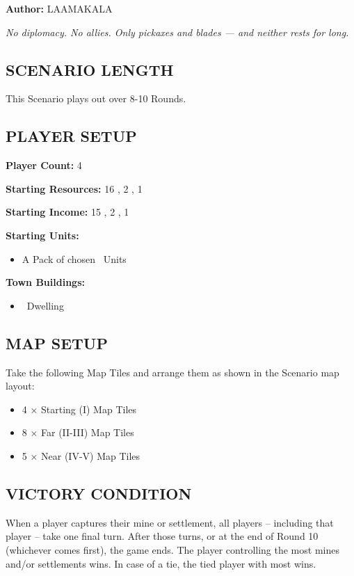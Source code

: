 
\begin{multicols*}{2}

\textbf{Author:} LAAMAKALA

\textit{No diplomacy. No allies. Only pickaxes and blades — and neither rests for long.}

\subsection*{\MakeUppercase{Scenario Length}}
This Scenario plays out over 8-10 Rounds.

\subsection*{\MakeUppercase{Player Setup}}
\textbf{Player Count:} 4

\textbf{Starting Resources:} 16 , 2 , 1 

\textbf{Starting Income:} 15 , 2 , 1 

\textbf{Starting Units:}
\begin{itemize}
  \item A Pack of chosen \bronze\ Units
\end{itemize}

\textbf{Town Buildings:}
\begin{itemize}
  \item \bronze\ Dwelling
\end{itemize}

\subsection*{\MakeUppercase{Map Setup}}
Take the following Map Tiles and arrange them as shown in the Scenario map layout:

\begin{itemize}
  \item 4 × Starting (I) Map Tiles
  \item 8 × Far (II-III) Map Tiles
  \item 5 × Near (IV-V) Map Tiles
\end{itemize}

\subsection*{\MakeUppercase{Victory Condition}}
When a player captures their  mine or settlement, all players -- including that player -- take one final turn. After those turns, or at the end of Round 10 (whichever comes first), the game ends. The player controlling the most mines and/or settlements wins. In case of a tie, the tied player with most  wins.


\end{multicols*}

